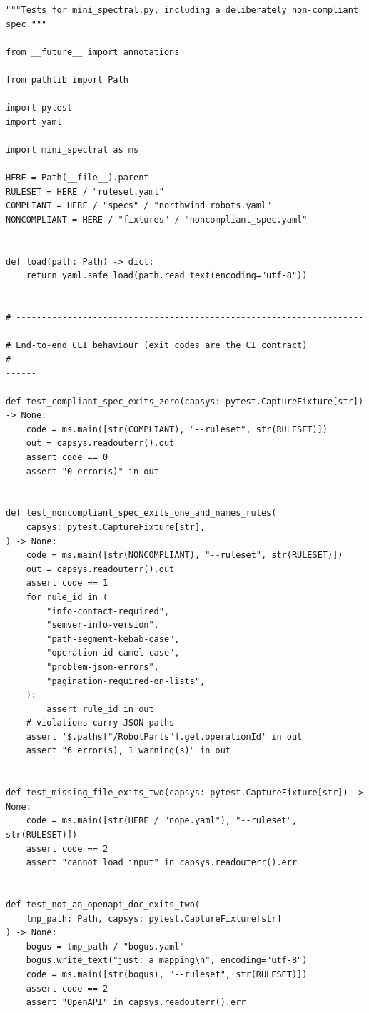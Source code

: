 \begin{verbatim}
"""Tests for mini_spectral.py, including a deliberately non-compliant spec."""

from __future__ import annotations

from pathlib import Path

import pytest
import yaml

import mini_spectral as ms

HERE = Path(__file__).parent
RULESET = HERE / "ruleset.yaml"
COMPLIANT = HERE / "specs" / "northwind_robots.yaml"
NONCOMPLIANT = HERE / "fixtures" / "noncompliant_spec.yaml"


def load(path: Path) -> dict:
    return yaml.safe_load(path.read_text(encoding="utf-8"))


# --------------------------------------------------------------------------
# End-to-end CLI behaviour (exit codes are the CI contract)
# --------------------------------------------------------------------------

def test_compliant_spec_exits_zero(capsys: pytest.CaptureFixture[str]) -> None:
    code = ms.main([str(COMPLIANT), "--ruleset", str(RULESET)])
    out = capsys.readouterr().out
    assert code == 0
    assert "0 error(s)" in out


def test_noncompliant_spec_exits_one_and_names_rules(
    capsys: pytest.CaptureFixture[str],
) -> None:
    code = ms.main([str(NONCOMPLIANT), "--ruleset", str(RULESET)])
    out = capsys.readouterr().out
    assert code == 1
    for rule_id in (
        "info-contact-required",
        "semver-info-version",
        "path-segment-kebab-case",
        "operation-id-camel-case",
        "problem-json-errors",
        "pagination-required-on-lists",
    ):
        assert rule_id in out
    # violations carry JSON paths
    assert '$.paths["/RobotParts"].get.operationId' in out
    assert "6 error(s), 1 warning(s)" in out


def test_missing_file_exits_two(capsys: pytest.CaptureFixture[str]) -> None:
    code = ms.main([str(HERE / "nope.yaml"), "--ruleset", str(RULESET)])
    assert code == 2
    assert "cannot load input" in capsys.readouterr().err


def test_not_an_openapi_doc_exits_two(
    tmp_path: Path, capsys: pytest.CaptureFixture[str]
) -> None:
    bogus = tmp_path / "bogus.yaml"
    bogus.write_text("just: a mapping\n", encoding="utf-8")
    code = ms.main([str(bogus), "--ruleset", str(RULESET)])
    assert code == 2
    assert "OpenAPI" in capsys.readouterr().err



\end{verbatim}
